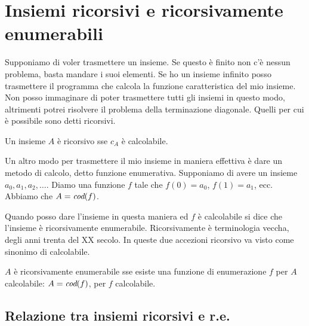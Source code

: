 %
%
%
%
\chapter{Insiemi ricorsivi e ricorsivamente enumerabili}

Supponiamo di voler trasmettere un insieme. Se questo è finito non c'è nessun problema, basta
mandare i suoi elementi. Se ho un insieme infinito posso trasmettere il programma che calcola la
funzione caratteristica del mio insieme. Non posso immaginare di poter trasmettere tutti gli insiemi
in questo modo, altrimenti potrei risolvere il problema della terminazione diagonale. Quelli per
cui è possibile sono detti ricorsivi.

\begin{defn}
    Un insieme $A$ è ricorsivo sse $c_{A}$ è calcolabile.
\end{defn}

Un altro modo per trasmettere il mio insieme in maniera effettiva è dare un metodo di calcolo,
detto funzione enumerativa. Supponiamo di avere un insieme ${a_{0},a_{1},a_{2},\dotsc}.$ Diamo una
funzione $f$ tale che $f(0) = a_{0}$, $f(1) = a_{1}$, ecc. Abbiamo che $A = \textit{cod}(f)$.

Quando posso dare l'insieme in questa maniera ed $f$ è calcolabile si dice che l'insieme è
ricorsivamente enumerabile. Ricorsivamente è terminologia veccha, degli anni trenta del XX secolo.
In queste due accezioni ricorsivo va visto come sinonimo di calcolabile.

\begin{defn}
    $A$ è ricorsivamente enumerabile sse esiste una funzione di enumerazione $f$ per $A$
    calcolabile: $A = \textit{cod}(f)$, per $f$ calcolabile.
\end{defn}

\section{Relazione tra insiemi ricorsivi e r.e.}

